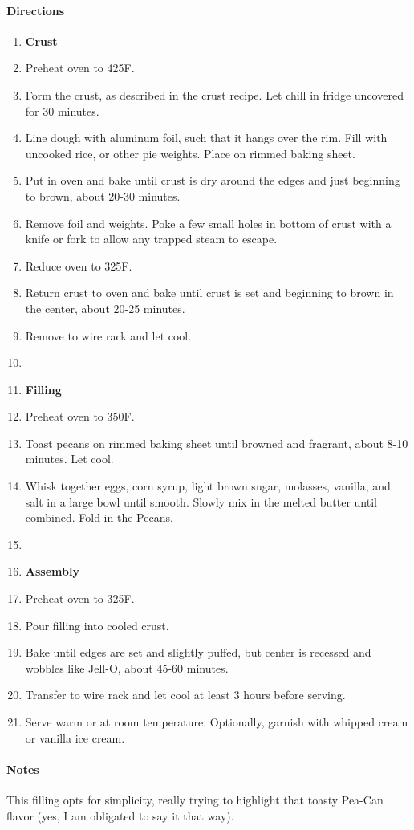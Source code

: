 \documentclass[12pt]{article}
\newenvironment*{directions}
	{
		\paragraph*{Directions}
		\begin{enumerate}
	}
	{
		\end{enumerate}
	}
\newenvironment*{notes}
	{
		\paragraph*{Notes}
		\begin{adjustwidth}{1cm}{}
	}
	{
		\end{adjustwidth}
	}
\begin{document}
	\begin{directions}
		\item[] \textbf{Crust}
		\item Preheat oven to 425F.
		\item Form the crust, as described in the crust recipe. Let chill in fridge uncovered for 30 minutes.
		\item Line dough with aluminum foil, such that it hangs over the rim. Fill with uncooked rice, or other pie weights. Place on rimmed baking sheet.
		\item Put in oven and bake until crust is dry around the edges and just beginning to brown, about 20-30 minutes.
		\item Remove foil and weights. Poke a few small holes in bottom of crust with a knife or fork to allow any trapped steam to escape.
		\item Reduce oven to 325F.
		\item Return crust to oven and bake until crust is set and beginning to brown in the center, about 20-25 minutes.
		\item Remove to wire rack and let cool.
		\item[] \hfill
		\item[] \textbf{Filling}
		\item Preheat oven to 350F.
		\item Toast pecans on rimmed baking sheet until browned and fragrant, about 8-10 minutes. Let cool.
		\item Whisk together eggs, corn syrup, light brown sugar, molasses, vanilla, and salt in a large bowl until smooth. Slowly mix in the melted butter until combined. Fold in the Pecans.
		\item[] \hfill
		\item[] \textbf{Assembly}
		\item Preheat oven to 325F.
		\item Pour filling into cooled crust.
		\item Bake until edges are set and slightly puffed, but center is recessed and wobbles like Jell-O, about 45-60 minutes.
		\item Transfer to wire rack and let cool at least 3 hours before serving.
		\item Serve warm or at room temperature. Optionally, garnish with whipped cream or vanilla ice cream.
	\end{directions}
	
	\begin{notes}
		This filling opts for simplicity, really trying to highlight that toasty Pea-Can flavor (yes, I am obligated to say it that way).
	\end{notes}
	
\end{document}
